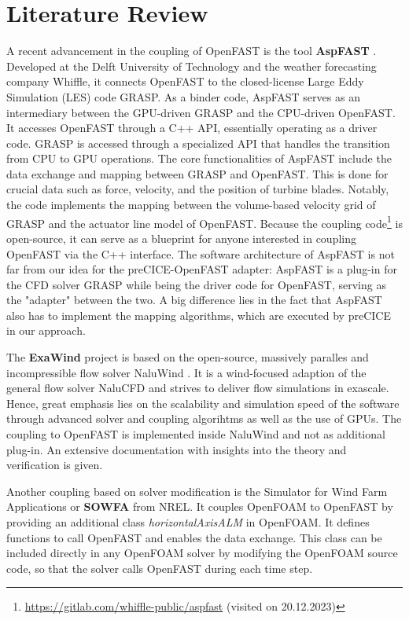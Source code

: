 \section{Literature Review}
\label{section:review}

A recent advancement in the coupling of OpenFAST is the tool \textbf{AspFAST} \cite{Taschner:2022}. Developed at the Delft University of Technology and the weather forecasting company Whiffle, it connects OpenFAST to the closed-license Large Eddy Simulation (LES) code GRASP. 
As a binder code, AspFAST serves as an intermediary between the GPU-driven GRASP and the CPU-driven OpenFAST. It accesses OpenFAST through a C++ API, essentially operating as a driver code. GRASP is accessed through a specialized API that handles the transition from CPU to GPU operations.
The core functionalities of AspFAST include the data exchange and mapping between GRASP and OpenFAST. This is done for crucial data such as force, velocity, and the position of turbine blades. Notably, the code implements the mapping between the volume-based velocity grid of GRASP and the actuator line model of OpenFAST. Because the coupling  code\footnote{\url{https://gitlab.com/whiffle-public/aspfast} (visited on 20.12.2023)} is open-source, it can serve as a blueprint for anyone interested in coupling OpenFAST via the C++ interface.
The software architecture of AspFAST is not far from our idea for the preCICE-OpenFAST adapter: AspFAST is a plug-in for the CFD solver GRASP while being the driver code for OpenFAST, serving as the "adapter" between the two. A big difference lies in the fact that AspFAST also has to implement the mapping algorithms, which are executed by preCICE in our approach.

The \textbf{ExaWind} project \cite{Sprague:2019} is based on the open-source, massively paralles and incompressible flow solver NaluWind \cite{Ananthan:2019}. It is a wind-focused adaption of the general flow solver NaluCFD and strives to deliver flow simulations in exascale. Hence, great emphasis lies on the scalability and simulation speed of the software through advanced solver and coupling algorihtms as well as the use of GPUs. The coupling to OpenFAST is implemented inside NaluWind and not as additional plug-in. An extensive documentation with insights into the theory and verification is given. 

Another coupling based on solver modification is the Simulator for Wind Farm Applications or \textbf{SOWFA} \cite{Churchfield:2012} from NREL. It couples OpenFOAM to OpenFAST by providing an additional  class \textit{horizontalAxisALM} in OpenFOAM. It defines functions to call OpenFAST and enables the data exchange. This class can be included directly in any OpenFOAM solver by modifying the OpenFOAM source code, so that the solver calls OpenFAST during each time step.


